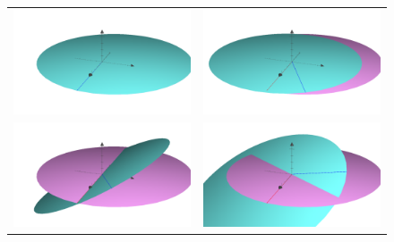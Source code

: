 \documentclass[11pt,a4paper,oneside,onecolumn]{jarticle}
\begin{document}
\begin{figure}[H]
\begin{tabular}{cc}
\begin{minipage}[t]{0.45\hsize}
\centering
\includegraphics[width=7cm]{./image/ellipse1.pdf}
\end{minipage} &
\begin{minipage}[t]{0.45\hsize}
\centering
\includegraphics[width=7cm]{./image/ellipse2.pdf}
\end{minipage}\\
%
\begin{minipage}[t]{0.45\hsize}
\centering
\includegraphics[width=7cm]{./image/ellipse3.pdf}
\end{minipage} &
\begin{minipage}[t]{0.45\hsize}
\centering
\includegraphics[width=7cm]{./image/ellipse4.pdf}
\end{minipage}
%
\end{tabular}
\caption{\label{fig:grapher}}
\end{figure}
\end{document}
